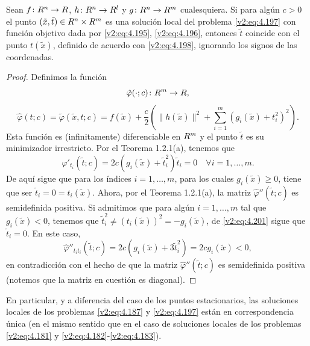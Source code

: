 \begin{lemma}\label{v2:lem:4.5.4}
    Sean $f \colon R^n \to R$, $h \colon R^n \to R^l$ y $g \colon R^n \to R^m$ cualesquiera. Si para algún $c > 0$ el punto $(\tilde{x}, \tilde{t}) \in R^n \times R^m$ es una solución local del problema \eqref{v2:eq:4.197} con función objetivo dada por \eqref{v2:eq:4.195}, \eqref{v2:eq:4.196}, entonces $\tilde{t}$ coincide con el punto $t(\tilde{x})$, definido de acuerdo con \eqref{v2:eq:4.198}, ignorando los signos de las coordenadas.
\end{lemma}
\begin{proof}
    Definimos la función
    \[
        \hat{\varphi}(\cdot; c) \colon R^m \to R,
    \]
    \[
        \hat{\varphi}(t; c) = \tilde{\varphi}(\tilde{x}, t; c) = f(\tilde{x}) + \frac{c}{2} \left( \|h(\tilde{x})\|^2 + \sum_{i=1}^m (g_i(\tilde{x}) + t_i^2)^2 \right).
    \]
    Esta función es (infinitamente) diferenciable en $R^m$ y el punto $\tilde{t}$ es su minimizador irrestricto. Por el Teorema 1.2.1(a), tenemos que
    \begin{equation}
        \hat{\varphi}'_{t_i}(\tilde{t}; c) = 2c(g_i(\tilde{x}) + \tilde{t}_i^2)\tilde{t}_i = 0 \quad \forall i = 1, \dots, m.
        \label{v2:eq:4.201}
    \end{equation}
    De aquí sigue que para los índices $i = 1, \dots, m$, para los cuales $g_i(\tilde{x}) \ge 0$, tiene que ser $\tilde{t}_i = 0 = t_i(\tilde{x})$.
    Ahora, por el Teorema 1.2.1(a), la matriz $\hat{\varphi}''(\tilde{t}; c)$ es semidefinida positiva. Si admitimos que para algún $i = 1, \dots, m$ tal que $g_i(\tilde{x}) < 0$, tenemos que $\tilde{t}_i^2 \neq (t_i(\tilde{x}))^2 = -g_i(\tilde{x})$, de \eqref{v2:eq:4.201} sigue que $\tilde{t}_i = 0$. En este caso,
    \[
        \hat{\varphi}''_{t_i t_i}(\tilde{t}; c) = 2c(g_i(\tilde{x}) + 3\tilde{t}_i^2) = 2cg_i(\tilde{x}) < 0,
    \]
    en contradicción con el hecho de que la matriz $\hat{\varphi}''(\tilde{t}; c)$ es semidefinida positiva (notemos que la matriz en cuestión es diagonal).
\end{proof}

En particular, y a diferencia del caso de los puntos estacionarios, las soluciones locales de los problemas \eqref{v2:eq:4.187} y \eqref{v2:eq:4.197} están en correspondencia única (en el mismo sentido que en el caso de soluciones locales de los problemas \eqref{v2:eq:4.181} y \eqref{v2:eq:4.182}-\eqref{v2:eq:4.183}).

